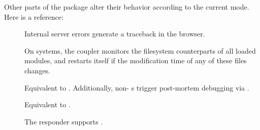 Other parts of the  package alter their behavior according to the
current mode. Here is a reference:

\begin{description}

\item[]
    Internal server errors generate a traceback in the browser.

    On \UNIX{} systems, the  coupler monitors the filesystem
    counterparts of all loaded modules, and restarts itself if the modification
    time of any of these files changes.

\item[]
    Equivalent to . Additionally, non-
    s trigger post-mortem debugging via
    .

\item[]
    Equivalent to .

\item[]
    The  responder supports .

\end{description}



\section{}
\section{}


